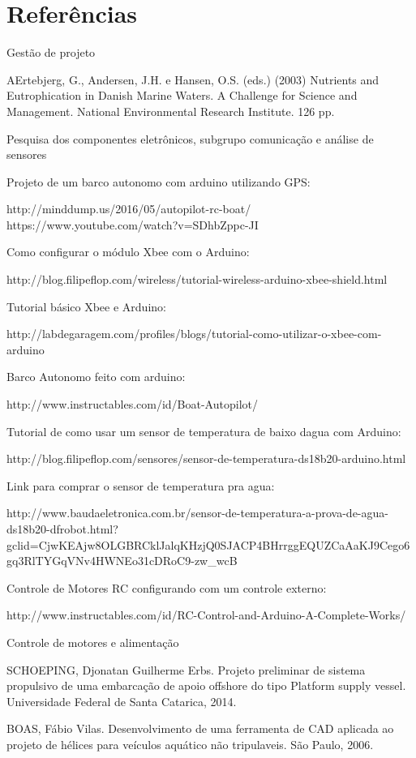 
\chapter[Referências]{Referências}

Gestão de projeto

AErtebjerg, G., Andersen, J.H. e Hansen, O.S. (eds.) (2003) Nutrients and Eutrophication in Danish Marine Waters. A Challenge for Science and Management. National Environmental Research Institute. 126 pp.

Pesquisa dos componentes eletrônicos, subgrupo comunicação e análise de sensores

Projeto de um barco autonomo com arduino utilizando GPS:

http://minddump.us/2016/05/autopilot-rc-boat/
https://www.youtube.com/watch?v=SDhbZppc-JI

Como configurar o módulo Xbee com o Arduino:

http://blog.filipeflop.com/wireless/tutorial-wireless-arduino-xbee-shield.html

Tutorial básico Xbee e Arduino:

http://labdegaragem.com/profiles/blogs/tutorial-como-utilizar-o-xbee-com-arduino

Barco Autonomo feito com arduino:

http://www.instructables.com/id/Boat-Autopilot/

Tutorial de como usar um sensor de temperatura de baixo dagua com Arduino:

http://blog.filipeflop.com/sensores/sensor-de-temperatura-ds18b20-arduino.html

Link para comprar o sensor de temperatura pra agua:

http://www.baudaeletronica.com.br/sensor-de-temperatura-a-prova-de-agua-ds18b20-dfrobot.html?gclid=CjwKEAjw8OLGBRCklJalqKHzjQ0SJACP4BHrrggEQUZCaAaKJ9Cego6gq3RlTYGqVNv4HWNEo31cDRoC9-zw\_wcB

Controle de Motores RC configurando com um controle externo:

http://www.instructables.com/id/RC-Control-and-Arduino-A-Complete-Works/


Controle de motores e alimentação

SCHOEPING, Djonatan Guilherme Erbs. Projeto preliminar de sistema propulsivo de uma embarcação de apoio offshore do tipo Platform supply vessel. Universidade Federal de Santa Catarica, 2014.

BOAS, Fábio Vilas. Desenvolvimento de uma ferramenta de CAD aplicada ao projeto de hélices para veículos aquático não tripulaveis. São Paulo, 2006.

